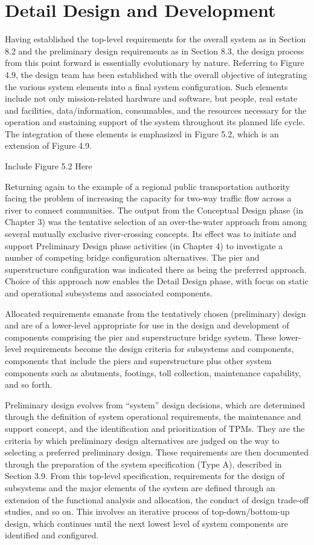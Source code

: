 \section{Detail Design and Development}

Having established the top-level requirements for the overall system as in Section 8.2 and the preliminary design requirements as in Section 8.3, the design process from this point forward is essentially evolutionary by nature. Referring to Figure 4.9, the design team has been established with the overall objective of integrating the various system elements into a final system configuration. Such elements include not only mission-related hardware and software, but people, real estate and facilities, data/information, consumables, and the resources necessary for the operation and sustaining support of the system throughout its planned life cycle. The integration of these elements is emphasized in Figure 5.2, which is an extension of Figure 4.9.

Include Figure 5.2 Here

Returning again to the example of a regional public transportation authority facing the problem of increasing the capacity for two-way traffic flow across a river to connect communities. The output from the Conceptual Design phase (in Chapter 3) was the tentative selection of an over-the-water approach from among several mutually exclusive river-crossing concepts. Its effect was to initiate and support Preliminary Design phase activities (in Chapter 4) to investigate a number of competing bridge configuration alternatives. The pier and superstructure configuration was indicated there as being the preferred approach. Choice of this approach now enables the Detail Design phase, with focus on static and operational subsystems and associated components.

Allocated requirements emanate from the tentatively chosen (preliminary) design and are of a lower-level appropriate for use in the design and development of components comprising the pier and superstructure bridge system. These lower-level requirements become the design criteria for subsystems and components, components that include the piers and superstructure plus other system components such as abutments, footings, toll collection, maintenance capability, and so forth.

Preliminary design evolves from ``system'' design decisions, which are determined through the definition of system operational requirements, the maintenance and support concept, and the identification and prioritization of TPMs. They are the criteria by which preliminary design alternatives are judged on the way to selecting a preferred preliminary design. These requirements are then documented through the preparation of the system specification (Type A), described in Section 3.9. From this top-level specification, requirements for the design of subsystems and the major elements of the system are defined through an extension of the functional analysis and allocation, the conduct of design trade-off studies, and so on. This involves an iterative process of top-down/bottom-up design, which continues until the next lowest level of system components are identified and configured.

